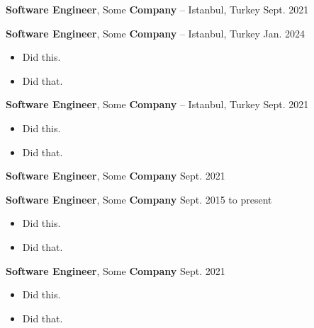 \documentclass[10pt, letterpaper]{article}
\newenvironment{highlights}{
        \begin{itemize}[
                topsep=0pt,
                partopsep=0pt,
                itemsep=0pt,
                leftmargin=10pt
            ]
    }{
        \end{itemize}
    } %
\begin{document}
        \vspace{8pt}

        \textbf{Software Engineer}, Some \textbf{Company} -- Istanbul, Turkey \hfill Sept. 2021



        \vspace{8pt}

        \textbf{Software Engineer}, Some \textbf{Company} -- Istanbul, Turkey \hfill Jan. 2024

        \begin{highlights}
        \item Did this.
        \item Did that.
        \end{highlights}


        \vspace{8pt}

        \textbf{Software Engineer}, Some \textbf{Company} -- Istanbul, Turkey \hfill Sept. 2021

        \begin{highlights}
        \item Did this.
        \item Did that.
        \end{highlights}


        \vspace{8pt}

        \textbf{Software Engineer}, Some \textbf{Company} \hfill Sept. 2021



        \vspace{8pt}

        \textbf{Software Engineer}, Some \textbf{Company} \hfill Sept. 2015 to present

        \begin{highlights}
        \item Did this.
        \item Did that.
        \end{highlights}


        \vspace{8pt}

        \textbf{Software Engineer}, Some \textbf{Company} \hfill Sept. 2021

        \begin{highlights}
        \item Did this.
        \item Did that.
        \end{highlights}
\end{document}
